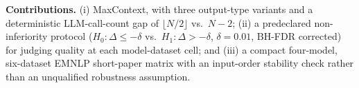 \textbf{Contributions.} (i) MaxContext, with three output-type variants
and a deterministic LLM-call-count gap of $\lfloor N/2 \rfloor$ vs.\
$N{-}2$; (ii) a predeclared non-inferiority protocol
($H_0: \Delta \le -\delta$ vs.\ $H_1: \Delta > -\delta$,
$\delta=0.01$, BH-FDR corrected) for judging quality at each
model-dataset cell; and (iii) a compact four-model, six-dataset EMNLP
short-paper matrix with an input-order stability check rather than an
unqualified robustness assumption.
